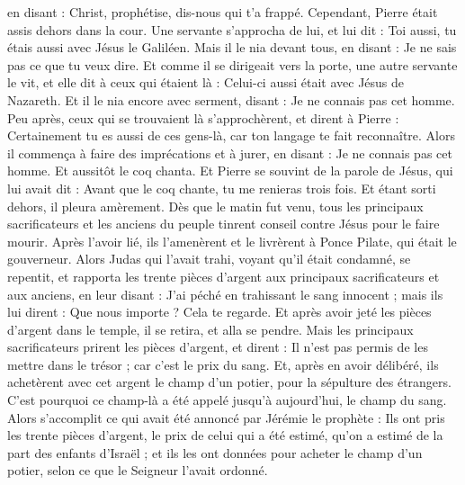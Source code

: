 \begin{multicols}{2}
en disant : Christ, prophétise, dis-nous qui t’a frappé.
Cependant, Pierre était assis dehors dans la cour. Une servante s'approcha de lui, et lui dit : Toi aussi, tu étais aussi avec Jésus le Galiléen.
Mais il le nia devant tous, en disant : Je ne sais pas ce que tu veux dire.
Et comme il se dirigeait vers la porte, une autre servante le vit, et elle dit à ceux qui étaient là : Celui-ci aussi était avec Jésus de Nazareth.
Et il le nia encore avec serment, disant : Je ne connais pas cet homme.
Peu après, ceux qui se trouvaient là s'approchèrent, et dirent à Pierre : Certainement tu es aussi de ces gens-là, car ton langage te fait reconnaître.
Alors il commença à faire des imprécations et à jurer, en disant : Je ne connais pas cet homme. Et aussitôt le coq chanta.
Et Pierre se souvint de la parole de Jésus, qui lui avait dit : Avant que le coq chante, tu me renieras trois fois. Et étant sorti dehors, il pleura amèrement.
\VerseOne{}Dès que le matin fut venu, tous les principaux sacrificateurs et les anciens du peuple tinrent conseil contre Jésus pour le faire mourir.
Après l’avoir lié, ils l'amenèrent et le livrèrent à Ponce Pilate, qui était le gouverneur.
Alors Judas qui l'avait trahi, voyant qu'il était condamné, se repentit, et rapporta les trente pièces d'argent aux principaux sacrificateurs et aux anciens,
en leur disant : J’ai péché en trahissant le sang innocent ; mais ils lui dirent : Que nous importe ? Cela te regarde.
Et après avoir jeté les pièces d'argent dans le temple, il se retira, et alla se pendre.
Mais les principaux sacrificateurs prirent les pièces d'argent, et dirent : Il n'est pas permis de les mettre dans le trésor ; car c’est le prix du sang.
Et, après en avoir délibéré, ils achetèrent avec cet argent le champ d'un potier, pour la sépulture des étrangers.
C'est pourquoi ce champ-là a été appelé jusqu'à aujourd'hui, le champ du sang.
Alors s’accomplit ce qui avait été annoncé par Jérémie le prophète : Ils ont pris les trente pièces d'argent, le prix de celui qui a été estimé, qu’on a estimé de la part des enfants d'Israël ;
et ils les ont données pour acheter le champ d'un potier, selon ce que le Seigneur l’avait ordonné{}.

\end{multicols}
